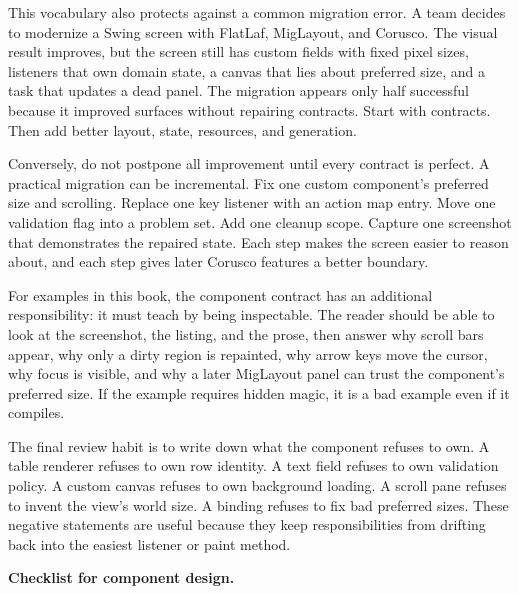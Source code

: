 This vocabulary also protects against a common migration error. A team decides to modernize a Swing screen with FlatLaf, MigLayout, and Corusco. The visual result improves, but the screen still has custom fields with fixed pixel sizes, listeners that own domain state, a canvas that lies about preferred size, and a task that updates a dead panel. The migration appears only half successful because it improved surfaces without repairing contracts. Start with contracts. Then add better layout, state, resources, and generation.

Conversely, do not postpone all improvement until every contract is perfect. A practical migration can be incremental. Fix one custom component's preferred size and scrolling. Replace one key listener with an action map entry. Move one validation flag into a problem set. Add one cleanup scope. Capture one screenshot that demonstrates the repaired state. Each step makes the screen easier to reason about, and each step gives later Corusco features a better boundary.

For examples in this book, the component contract has an additional responsibility: it must teach by being inspectable. The reader should be able to look at the screenshot, the listing, and the prose, then answer why scroll bars appear, why only a dirty region is repainted, why arrow keys move the cursor, why focus is visible, and why a later MigLayout panel can trust the component's preferred size. If the example requires hidden magic, it is a bad example even if it compiles.

The final review habit is to write down what the component refuses to own. A table renderer refuses to own row identity. A text field refuses to own validation policy. A custom canvas refuses to own background loading. A scroll pane refuses to invent the view's world size. A binding refuses to fix bad preferred sizes. These negative statements are useful because they keep responsibilities from drifting back into the easiest listener or paint method.

\textbf{Checklist for component design.}


